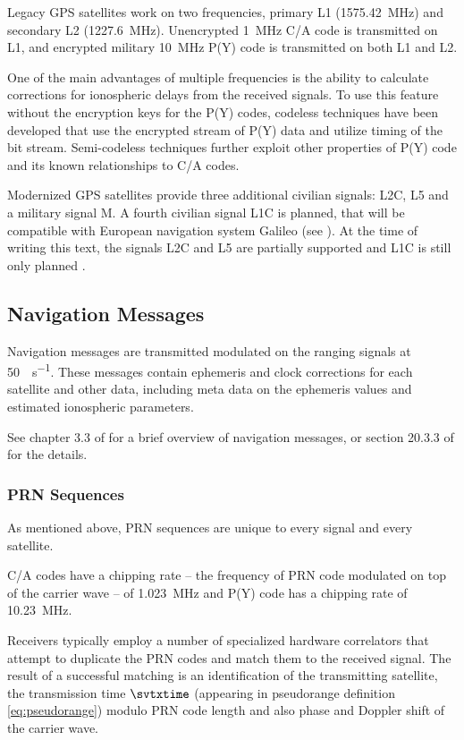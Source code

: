 Legacy GPS satellites work on two frequencies, primary L1 (\SI{1575.42}{\mega\hertz}) and secondary L2 (\SI{1227.6}{\mega\hertz}).
Unencrypted \SI{1}{\mega\hertz} C/A code is transmitted on L1, and encrypted military \SI{10}{\mega\hertz} P(Y) code is transmitted
on both L1 and L2.

One of the main advantages of multiple frequencies is the ability to calculate corrections for ionospheric delays from the received signals.
To use this feature without the encryption keys for the P(Y) codes, codeless techniques have been developed
that use the encrypted stream of P(Y) data and utilize timing of the bit stream.
Semi-codeless techniques further exploit other properties of P(Y) code and its known relationships to C/A codes.

Modernized GPS satellites provide three additional civilian signals:
L2C, L5 and a military signal M. A fourth civilian signal L1C is planned, that will be compatible with
European navigation system Galileo (see ).
At the time of writing this text, the signals L2C and L5 are partially supported and L1C is still only
planned \cite{gps-modernization-www}.

\subsection{Navigation Messages}
Navigation messages are transmitted modulated on the ranging signals at \SI{50}{\bit\per\second}.
These messages contain ephemeris and clock corrections for each satellite
and other data, including meta data on the ephemeris values and estimated
ionospheric parameters.

See chapter 3.3 of \cite{rizos99} for a brief overview of navigation messages,
or section 20.3.3 of \cite{fyfe92} for the details.

\subsubsection{PRN Sequences}
As mentioned above, PRN sequences are unique to every signal and every satellite.

C/A codes have a chipping rate -- the frequency of PRN code modulated on top
of the carrier wave -- of \SI{1.023}{\mega\hertz} and P(Y) code has a chipping rate
of \SI{10.23}{\mega\hertz}.

Receivers typically employ a number of specialized hardware correlators
that attempt to duplicate the PRN codes and match them to the received signal.
The result of a successful matching is an identification of the transmitting satellite,
the transmission time \(\svtxtime\) (appearing in pseudorange definition \eqref{eq:pseudorange})
modulo PRN code length and also phase and Doppler shift of the carrier wave.

